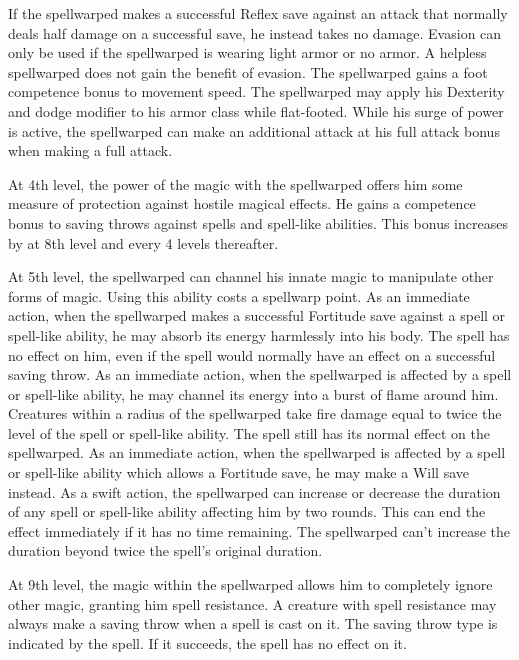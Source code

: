  If the spellwarped makes a successful Reflex save against an attack that normally deals half damage on a successful save, he instead takes no damage. Evasion can only be used if the spellwarped is wearing light armor or no armor. A helpless spellwarped does not gain the benefit of evasion.
 The spellwarped gains a  foot competence bonus to movement speed.
 The spellwarped may apply his Dexterity and dodge modifier to his armor class while flat-footed.
 While his surge of power is active, the spellwarped can make an additional attack at his full attack bonus when making a full attack.

 At 4th level, the power of the magic with the spellwarped offers him some measure of protection against hostile magical effects. He gains a  competence bonus to saving throws against spells and spell-like abilities. This bonus increases by  at 8th level and every 4 levels thereafter.

 At 5th level, the spellwarped can channel his innate magic to manipulate other forms of magic. Using this ability costs a spellwarp point. 
 As an immediate action, when the spellwarped makes a successful Fortitude save against a spell or spell-like ability, he may absorb its energy harmlessly into his body. The spell has no effect on him, even if the spell would normally have an effect on a successful saving throw.
 As an immediate action, when the spellwarped is affected by a spell or spell-like ability, he may channel its energy into a burst of flame around him. Creatures within a \areasmall radius of the spellwarped take fire damage equal to twice the level of the spell or spell-like ability. The spell still has its normal effect on the spellwarped.
 As an immediate action, when the spellwarped is affected by a spell or spell-like ability which allows a Fortitude save, he may make a Will save instead.
 As a swift action, the spellwarped can increase or decrease the duration of any spell or spell-like ability affecting him by two rounds. This can end the effect immediately if it has no time remaining. The spellwarped can't increase the duration beyond twice the spell's original duration.

 At 9th level, the magic within the spellwarped allows him to completely ignore other magic, granting him spell resistance. A creature with spell resistance may always make a saving throw when a spell is cast on it. The saving throw type is indicated by the spell. If it succeeds, the spell has no effect on it.

